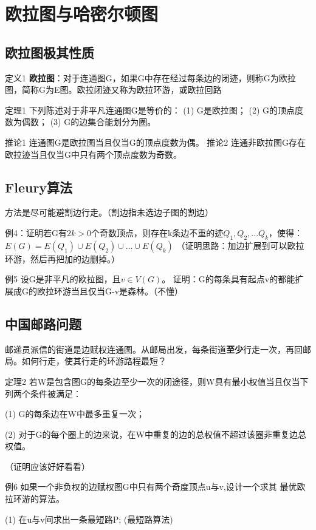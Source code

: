 \documentclass{article}
\begin{document}
\section{欧拉图与哈密尔顿图}

\subsection{欧拉图极其性质}

定义1 \textbf{欧拉图}：对于连通图G，如果G中存在经过每条边的闭迹，则称G为欧拉图，简称G为E图。欧拉闭迹又称为欧拉环游，或欧拉回路

定理1 下列陈述对于非平凡连通图G是等价的：
(1) G是欧拉图；
(2) G的顶点度数为偶数；
(3) G的边集合能划分为圈。

推论1 连通图G是欧拉图当且仅当G的顶点度数为偶。
推论2 连通非欧拉图G存在欧拉迹当且仅当G中只有两个顶点度数为奇数。

\subsection{Fleury算法}

方法是尽可能避割边行走。（割边指未选边子图的割边）

例4：证明若G有$2k>0$个奇数顶点，则存在k条边不重的迹$Q_1, Q_2, ... Q_k$，使得：$E(G) = E(Q_1) \cup E(Q_2) \cup ... \cup E(Q_k)$ （证明思路：加边扩展到可以欧拉环游，然后再把加的边删掉。）

例5 设G是非平凡的欧拉图，且$v \in V(G)$。 证明：G的每条具有起点v的都能扩展成G的欧拉环游当且仅当G-v是森林。（不懂）

\subsection{中国邮路问题}

邮递员派信的街道是边赋权连通图。从邮局出发，每条街道\textbf{至少}行走一次，再回邮局。如何行走，使其行走的环游路程最短？

定理2 若W是包含图G的每条边至少一次的闭途径，则W具有最小权值当且仅当下列两个条件被满足：

(1) G的每条边在W中最多重复一次；

(2) 对于G的每个圈上的边来说，在W中重复的边的总权值不超过该圈非重复边总权值。

（证明应该好好看看）

例6 如果一个非负权的边赋权图G中只有两个奇度顶点u与v,设计一个求其
最优欧拉环游的算法。

(1) 在u与v间求出一条最短路P; (最短路算法)
\end{document}
